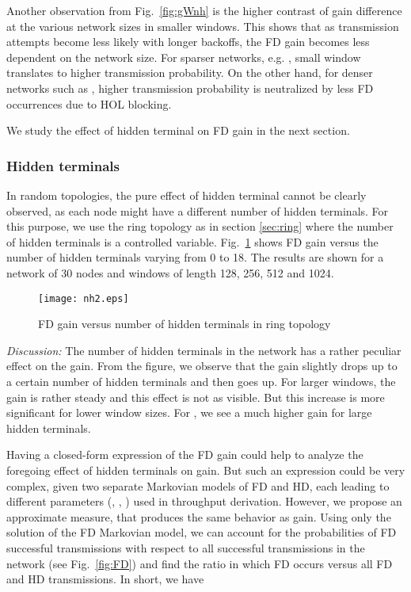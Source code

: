 \documentclass[10pt,journal,cspaper,compsoc]{IEEEtran}
\begin{document}
Another observation from Fig.~\ref{fig:gWnh} is the higher contrast of gain difference at the various network sizes in smaller windows. This shows that as transmission attempts become less likely with longer backoffs, the FD gain becomes less dependent on the network size. For sparser networks, e.g. , small window translates to higher transmission probability. On the other hand, for denser networks such as , higher transmission probability is neutralized by less FD occurrences due to HOL blocking.











We study the effect of hidden terminal on FD gain in the next section. 

\subsubsection{Hidden terminals}
In random topologies, the pure effect of hidden terminal cannot be clearly observed, as each node might have a different number of hidden terminals. For this purpose, we use the ring topology as in section \ref{sec:ring} where the number of hidden terminals is a controlled variable. Fig.~\ref{fig:gNnh} shows FD gain versus the number of hidden terminals varying from 0 to 18. The results are shown for a network of 30 nodes and windows of length 128, 256, 512 and 1024. 

\begin{figure}[!t]
\centering
\texttt{[image: nh2.eps]}
\caption{FD gain versus number of hidden terminals in ring topology}
\label{fig:gNnh}
\end{figure} 


\textit{Discussion:} The number of hidden terminals in the network has a rather peculiar effect on the gain. From the figure, we observe that the gain slightly drops up to a certain number of hidden terminals and then goes up. For larger windows, the gain is rather steady and this effect is not as visible. But this increase is more significant for lower window sizes. For , we see a much higher gain for large hidden terminals. 

Having a closed-form expression of the FD gain could help to analyze the foregoing effect of hidden terminals on gain. But such an expression could be very complex, given two separate Markovian models of FD and HD, each leading to different parameters (, , ) used in throughput derivation. However, we propose an approximate measure, that produces the same behavior as gain. Using only the solution of the FD Markovian model, we can account for the probabilities of FD successful transmissions with respect to all successful transmissions in the network (see Fig.~\ref{fig:FD}) and find the ratio in which FD occurs versus all FD and HD transmissions. In short, we have
\end{document}
